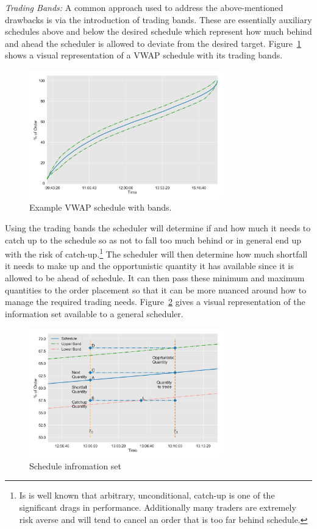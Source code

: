 \noindent\emph{Trading Bands:} A common approach used to address the above-mentioned drawbacks is via the introduction of trading bands. These are essentially auxiliary schedules above and below the desired schedule which represent how much behind and ahead the scheduler is allowed to deviate from the desired target. Figure~\ref{fig:schedule} shows a visual representation of a VWAP schedule with its trading bands. 


	\begin{figure}[!ht]
	\centering
	\includegraphics[width=0.75\textwidth]{chapters/chapter_exec_models/figures/schedule.png} 
	\caption{Example VWAP schedule with bands.\label{fig:schedule}}
	\end{figure}


Using the trading bands the scheduler will determine if and how much it needs to catch up to the schedule so as not to fall too much behind or in general end up with the risk of catch-up.\footnote{Is is well known that arbitrary, unconditional, catch-up is one of the significant drags in performance. Additionally many traders are extremely risk averse and will tend to cancel an order that is too far behind schedule.} The scheduler will then determine how much shortfall it needs to make up and the opportunistic quantity it has available since it is allowed to be ahead of schedule. It can then pass these minimum and maximum quantities to the order placement so that it can be more nuanced around how to manage the required trading needs. Figure~\ref{fig:sch_details} gives a visual representation of the information set available to a general scheduler.


	\begin{figure}[!ht]
	\centering
	\includegraphics[width=0.75\textwidth]{chapters/chapter_exec_models/figures/schedule_details.png} 
	\caption{Schedule infromation set \label{fig:sch_details}}
	\end{figure}


